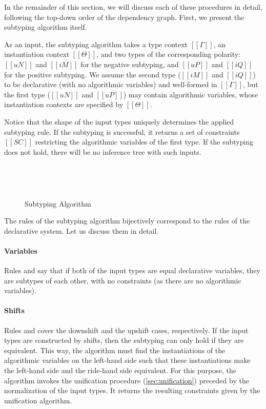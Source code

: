 In the remainder of this section, we will discuss each of these procedures in
detail, following the top-down order of the dependency graph. First, we present
the subtyping algorithm itself.

As an input, the subtyping algorithm takes
a type context $[[Γ]]$, an instantiation context $[[Θ]]$,
and two types of the corresponding polarity:
$[[uN]]$ and  $[[iM]]$ for the negative subtyping, and
$[[uP]]$ and  $[[iQ]]$ for the positive subtyping.
We assume the second type ($[[iM]]$ and $[[iQ]]$) to be 
declarative (with no algorithmic variables) and well-formed in $[[Γ]]$,
but the first type ($[[uN]]$ and $[[uP]]$) may contain algorithmic variables,
whose instantiation contexts are specified by $[[Θ]]$.

Notice that the shape of the input types uniquely determines the
applied subtyping rule.  If the subtyping is successful, it returns
a set of constraints $[[SC]]$ restricting the algorithmic 
variables of the first type. If the subtyping does not hold, 
there will be no inference tree with such inputs. 

\begin{figure}[t]
  \hfill\\
  \begin{multicols}{2}
    \ottdefnANsubLabeled{}
    \columnbreak\\
    \ottdefnAPsupLabeled{}
  \end{multicols}
  \caption{Subtyping Algorithm}
  \label{fig:alg-subtyping}
\end{figure}

The rules of the subtyping algorithm bijectively correspond to the rules of the declarative
system. Let us discuss them in detail.

\paragraph*{Variables} Rules  and 
say that if both of the input types are equal declarative variables,
they are subtypes of each other, with no constraints (as there are no algorithmic variables).

\paragraph*{Shifts} Rules  and
 cover the downshift and the upshift cases,
respectively. If the input types are constructed by shifts, then the subtyping
can only hold if they are equivalent. This way, the algorithm must find the
instantiations of the algorithmic variables on the left-hand side
such that these instantiations make the left-hand side and the ride-hand side
equivalent. For this purpose, the algorithm invokes the
unification procedure (\cref{sec:unification}) preceded by the normalization of the input types.
It returns the resulting constraints given by the unification algorithm. 

